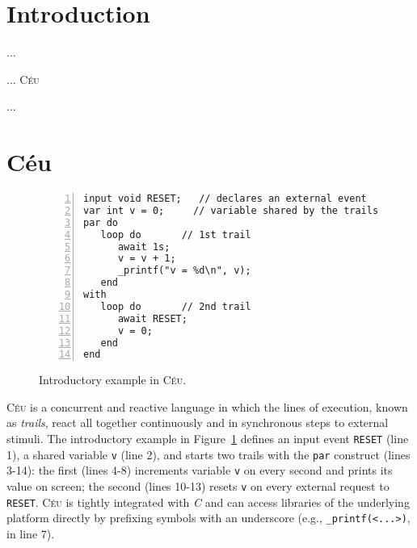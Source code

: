 \documentclass{acm_proc_article-sp}
\newcommand{\CEU}{\textsc{C\'{e}u}\xspace}
\newcommand{\code}[1] {{\small{\texttt{#1}}}}
\begin{document}



\section{Introduction}

...

... \CEU~\cite{ceu.sensys13,ceu.mod15}

...

\newpage
\section{C\'eu}

\begin{comment}
\item adts
\item description
\item expansion: pool / recursive spawn
\item mutation / safety / watching
\end{comment}

\begin{figure}%
\begin{lstlisting}[numbers=left,xleftmargin=3em]
input void RESET;   // declares an external event
var int v = 0;     // variable shared by the trails
par do
   loop do       // 1st trail
      await 1s;
      v = v + 1;
      _printf("v = %d\n", v);
   end
with
   loop do       // 2nd trail
      await RESET;
      v = 0;
   end
end
\end{lstlisting}
\caption{ Introductory example in \CEU.
\label{lst.intro}
}
\end{figure}

\CEU is a concurrent and reactive language in which the lines of execution, 
known as \emph{trails}, react all together continuously and in synchronous 
steps to external stimuli.
The introductory example in Figure~\ref{lst.intro} defines an input event 
\code{RESET} (line 1), a shared variable \code{v} (line 2), and starts two 
trails with the \code{par} construct (lines 3-14): the first (lines 4-8) 
increments variable \code{v} on every second and prints its value on screen; 
the second (lines 10-13) resets \code{v} on every external request to 
\code{RESET}.
\CEU is tightly integrated with \emph{C} and can access libraries of the 
underlying platform directly by prefixing symbols with an underscore (e.g., 
\code{\_printf(<...>)}, in line 7).
\end{document}
